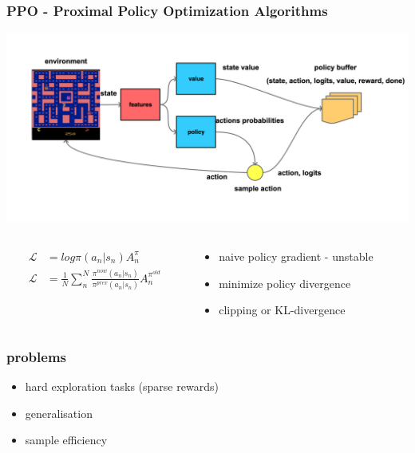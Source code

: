 \documentclass{beamer}
\begin{document}
\begin{frame}
  \frametitle{PPO - Proximal Policy Optimization Algorithms} 

  \centering
  \includegraphics[scale=0.1]{../diagrams/basic/ppo.png}


  \begin{columns}

    \begin{column}{0.5\textwidth}
      \begin{align*}
        \mathcal{L} &= log \pi(a_n | s_n) A_n^{\pi} \\
        \mathcal{L} &= \frac{1}{N} \sum_{n}^{N} \frac{\pi^{now}(a_n | s_n)} {\pi^{prev}(a_n | s_n)} A_n^{{\pi}^{old}}
      \end{align*} 
    \end{column}

    \begin{column}{0.5\textwidth}
      \begin{itemize}
        \item naive policy gradient - unstable
        \item minimize policy divergence
        \item clipping or KL-divergence 
      \end{itemize}
    \end{column}
  
  \end{columns}
  
  
\end{frame}


\begin{frame}
  \frametitle{problems} 

  \begin{itemize}
    \item hard exploration tasks (sparse rewards)
    \item generalisation
    \item sample efficiency 
  \end{itemize}

\end{frame}
\end{document}
